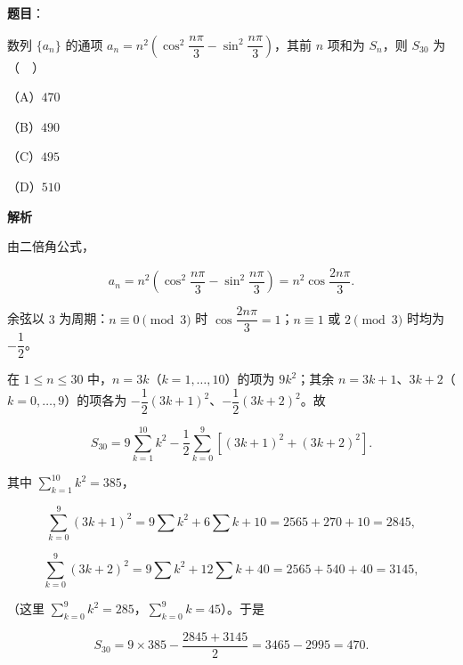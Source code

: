 \begin{answer}

\textbf{题目}：

数列 $\{a_n\}$ 的通项 $a_n=n^2\left(\cos^2\dfrac{n\pi}{3}-\sin^2\dfrac{n\pi}{3}\right)$，其前 $n$ 项和为 $S_n$，则 $S_{30}$ 为（　）

（A）$470$

（B）$490$

（C）$495$

（D）$510$

\textbf{解析}

由二倍角公式，

\nopagebreak[4]
\[a_n=n^2\left(\cos^2\frac{n\pi}{3}-\sin^2\frac{n\pi}{3}\right)=n^2\cos\frac{2n\pi}{3}.\]

余弦以 $3$ 为周期：$n\equiv0\pmod3$ 时 $\cos\dfrac{2n\pi}{3}=1$；$n\equiv1$ 或 $2\pmod3$ 时均为 $-\dfrac12$。

在 $1\leqslant n\leqslant30$ 中，$n=3k$（$k=1,\dots,10$）的项为 $9k^2$；其余 $n=3k+1$、$3k+2$（$k=0,\dots,9$）的项各为 $-\dfrac12(3k+1)^2$、$-\dfrac12(3k+2)^2$。故

\nopagebreak[4]
\[S_{30}=9\sum_{k=1}^{10}k^2-\frac12\sum_{k=0}^{9}\left[(3k+1)^2+(3k+2)^2\right].\]

其中 $\sum\limits_{k=1}^{10}k^2=385$，

\nopagebreak[4]
\[\sum_{k=0}^{9}(3k+1)^2=9\sum k^2+6\sum k+10=2565+270+10=2845,\]

\nopagebreak[4]
\[\sum_{k=0}^{9}(3k+2)^2=9\sum k^2+12\sum k+40=2565+540+40=3145,\]

（这里 $\sum\limits_{k=0}^{9}k^2=285$，$\sum\limits_{k=0}^{9}k=45$）。于是

\nopagebreak[4]
\[S_{30}=9\times385-\frac{2845+3145}{2}=3465-2995=470.\]


\end{answer}
